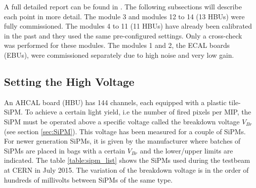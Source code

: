 A full detailed report can be found in \cite{Hartbrich2012}. The following subsections will describe each point in more detail. The module 3 and modules 12 to 14 (13 HBUs) were fully commissioned. The modules 4 to 11 (11 HBUs) have already been calibrated in the past and they used the same pre-configured settings. Only a cross-check was performed for these modules. The modules 1 and 2, the ECAL boards (EBUs), were commissioned separately due to high noise and very low gain.

\subsection{Setting the High Voltage}

\begin{table}[htb!]
  \centering
  \caption{List of the different SiPMs used in the CALICE AHCAL in July 2015.}
  \label{table:sipm_list}
\end{table}

An AHCAL board (HBU) has 144 channels, each equipped with a plastic tile-SiPM. To achieve a certain light yield, i.e the number of fired pixels per MIP, the SiPM must be operated above a specific voltage called the breakdown voltage $V_{Br}$ (see section \ref{sec:SiPM}). This voltage has been measured for a couple of SiPMs. For newer generation SiPMs, it is given by the manufacturer where batches of SiPMs are placed in bags with a certain $V_{Br}$ and the lower/upper limits are indicated. The table \ref{table:sipm_list} shows the SiPMs used during the testbeam at CERN in July 2015. The variation of the breakdown voltage is in the order of hundreds of millivolts between SiPMs of the same type.

